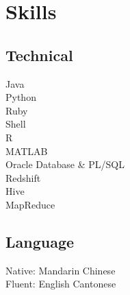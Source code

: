 \documentclass[]{deedy-resume-openfont}
\begin{document}
\begin{minipage}[t]{0.35\textwidth}

\section{Skills}
\subsection{Technical}
Java \\
Python \\
Ruby \\
Shell \\
R \\
MATLAB \\

Oracle Database \& PL/SQL \\
Redshift \\
Hive \\
MapReduce
\sectionsep

\subsection{Language}
Native: Mandarin Chinese \\
Fluent: English \textbullet{} Cantonese


%
%

\end{minipage} 
\hfill
\end{document}
